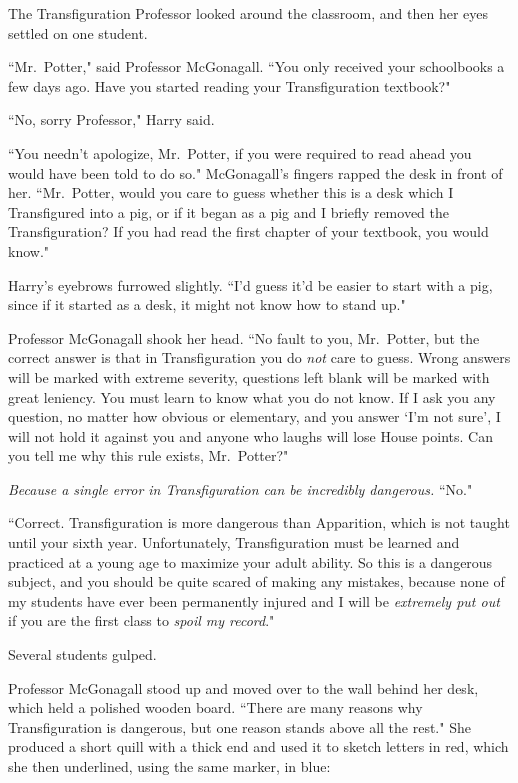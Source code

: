 The Transfiguration Professor looked around the classroom, and then her eyes settled on one student.

``Mr.~Potter," said Professor McGonagall. ``You only received your schoolbooks a few days ago. Have you started reading your Transfiguration textbook?"

``No, sorry Professor," Harry said.

``You needn't apologize, Mr.~Potter, if you were required to read ahead you would have been told to do so." McGonagall's fingers rapped the desk in front of her. ``Mr.~Potter, would you care to guess whether this is a desk which I Transfigured into a pig, or if it began as a pig and I briefly removed the Transfiguration? If you had read the first chapter of your textbook, you would know."

Harry's eyebrows furrowed slightly. ``I'd guess it'd be easier to start with a pig, since if it started as a desk, it might not know how to stand up."

Professor McGonagall shook her head. ``No fault to you, Mr.~Potter, but the correct answer is that in Transfiguration you do \emph{not} care to guess. Wrong answers will be marked with extreme severity, questions left blank will be marked with great leniency. You must learn to know what you do not know. If I ask you any question, no matter how obvious or elementary, and you answer `I'm not sure', I will not hold it against you and anyone who laughs will lose House points. Can you tell me why this rule exists, Mr.~Potter?"

\emph{Because a single error in Transfiguration can be incredibly dangerous.} ``No."

``Correct. Transfiguration is more dangerous than Apparition, which is not taught until your sixth year. Unfortunately, Transfiguration must be learned and practiced at a young age to maximize your adult ability. So this is a dangerous subject, and you should be quite scared of making any mistakes, because none of my students have ever been permanently injured and I will be \emph{extremely put out} if you are the first class to \emph{spoil my record}."

Several students gulped.

Professor McGonagall stood up and moved over to the wall behind her desk, which held a polished wooden board. ``There are many reasons why Transfiguration is dangerous, but one reason stands above all the rest." She produced a short quill with a thick end and used it to sketch letters in red, which she then underlined, using the same marker, in blue:

